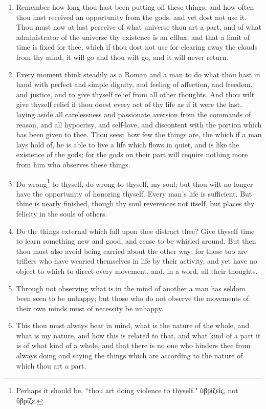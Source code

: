 \begin{enumerate}
\item Remember how long thou hast been putting off these things, and how often thou hast received an opportunity from the gods, and yet dost not use it. Thou must now at last perceive of what universe thou art a part, and of what administrator of the universe thy existence is an efflux, and that a limit of time is fixed for thee, which if thou dost not use for clearing away the clouds from thy mind, it will go and thou wilt go, and it will never return.

\item Every moment think steadily as a Roman and a man to do what thou hast in hand with perfect and simple dignity, and feeling of affection, and freedom, and justice, and to give thyself relief from all other thoughts. And thou wilt give thyself relief if thou doest every act of thy life as if it were the last, laying aside all carelessness and passionate aversion from the commands of reason, and all hypocrisy, and self-love, and discontent with the portion which has been given to thee. Thou seest how few the things are, the which if a man lays hold of, he is able to live a life which flows in quiet, and is like the existence of the gods; for the gods on their part will require nothing more from him who observes these things.

\item Do wrong\footnote{Perhaps it should be, ``thou art doing violence to thyself." \textgreek{ὑβρίζείς}, not \textgreek{ὕβρίζε}.} to thyself, do wrong to thyself, my soul; but thou wilt no longer have the opportunity of honoring thyself. Every man's life is sufficient. But thine is nearly finished, though thy soul reverences not itself, but places thy felicity in the souls of others.

\item Do the things external which fall upon thee distract thee? Give thyself time to learn something new and good, and cease to be whirled around. But then thou must also avoid being carried about the other way; for those too are triflers who have wearied themselves in life by their activity, and yet have no object to which to direct every movement, and, in a word, all their thoughts.

\item Through not observing what is in the mind of another a man has seldom been seen to be unhappy; but those who do not observe the movements of their own minds must of necessity be unhappy.

\item This thou must always bear in mind, what is the nature of the whole, and what is my nature, and how this is related to that, and what kind of a part it is of what kind of a whole, and that there is no one who hinders thee from always doing and saying the things which are according to the nature of which thou art a part.


\end{enumerate}
